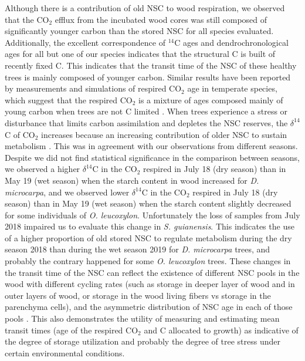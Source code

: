 \documentclass{article}
\begin{document}
Although there is a contribution of old NSC to wood respiration, we observed that the CO$_{2}$ efflux from the incubated wood cores was still composed of significantly younger carbon than the stored NSC for all species evaluated. Additionally, the excellent correspondence of $^{14}$C ages and dendrochronological ages for all but one of our species indicates that the structural C is built of recently fixed C. This indicates that the transit time of the NSC of these healthy trees is mainly composed of younger carbon. Similar results have been reported by measurements and simulations of respired CO$_{2}$ age in temperate species, which suggest that the respired CO$_{2}$ is a mixture of ages composed mainly of young carbon when trees are not C limited  \citep{muhr:2013, Richardson:2015, ceballos_nunez:2018, Herrera-Ramirez:2020}. When trees experience a stress or disturbance that limits carbon assimilation and depletes the NSC reserves, the $\delta^{14}$C of CO$_{2}$ increases because an increasing contribution of older NSC to sustain metabolism \citep{Herrera-Ramirez:2020, Richardson:2013aa, Muhr:2018}. This was in agreement with our observations from different seasons. Despite we did not find statistical significance in the comparison between seasons, we observed a higher $\delta^{14}$C in the CO$_{2}$ respired in July 18 (dry season) than in May 19 (wet season) when the starch content in wood increased for \textit{D. microcarpa}, and we observed lower $\delta^{14}$C in the CO$_{2}$ respired in July 18 (dry season) than in May 19 (wet season) when the starch content slightly decreased for some individuals of \textit{O. leucoxylon}. Unfortunately the loss of samples from July 2018 impaired us to evaluate this change in \textit{S. guianensis}. This indicates the use of a higher proportion of old stored NSC to regulate metabolism during the dry season 2018 than during the wet season 2019 for \textit{D. microcarpa} trees, and probably the contrary happened for some \textit{O. leucoxylon} trees. These changes in the transit time of the NSC can reflect the existence of different NSC pools in the wood with different cycling rates (such as storage in deeper layer of wood and in outer layers of wood, or storage in the wood living fibers vs storage in the parenchyma cells), and the asymmetric distribution of NSC age in each of those pools \citep{Herrera-Ramirez:2020}. This also demonstrates the utility of measuring and estimating mean transit times (age of the respired CO$_{2}$ and C allocated to growth) as indicative of the degree of storage utilization and probably the degree of tree stress under certain environmental conditions.
\end{document}
